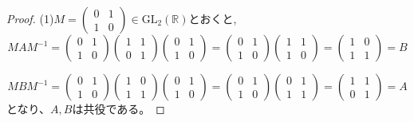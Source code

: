\begin{proof}
  (1)$M=\begin{pmatrix}0&1\\1&0 \end{pmatrix} \in \mathrm{GL}_2(\mathbb{R})$とおくと,
  \[MAM^{-1}=\begin{pmatrix}0&1\\1&0 \end{pmatrix}
  \begin{pmatrix}1&1\\0&1\end{pmatrix} \begin{pmatrix} 0&1\\1&0\end{pmatrix}
  =\begin{pmatrix} 0&1\\1&0\end{pmatrix}\begin{pmatrix}1&1\\1&0 \end{pmatrix}=\begin{pmatrix} 1&0\\1&1\end{pmatrix}=B\]
  
\[MBM^{-1}=\begin{pmatrix}0&1\\1&0 \end{pmatrix}
\begin{pmatrix}1&0\\1&1\end{pmatrix} 
\begin{pmatrix} 0&1\\1&0\end{pmatrix}
=\begin{pmatrix} 0&1\\1&0\end{pmatrix}\begin{pmatrix}0&1\\1&1 \end{pmatrix}
=\begin{pmatrix} 1&1\\0&1\end{pmatrix}=A\]
となり、$A,B$は共役である。


\end{proof}
